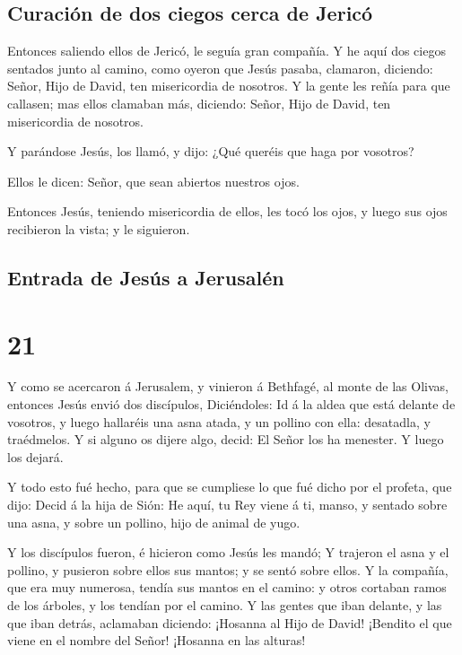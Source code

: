 \hypertarget{curaciuxf3n-de-dos-ciegos-cerca-de-jericuxf3}{%
\subsection{Curación de dos ciegos cerca de
Jericó}\label{curaciuxf3n-de-dos-ciegos-cerca-de-jericuxf3}}

 Entonces saliendo ellos de Jericó, le seguía gran
compañía.  Y he aquí dos ciegos sentados junto al camino,
como oyeron que Jesús pasaba, clamaron, diciendo: Señor, Hijo de David,
ten misericordia de nosotros.  Y la gente les reñía para
que callasen; mas ellos clamaban más, diciendo: Señor, Hijo de David,
ten misericordia de nosotros.

 Y parándose Jesús, los llamó, y dijo: ¿Qué queréis que
haga por vosotros?

 Ellos le dicen: Señor, que sean abiertos nuestros ojos.

 Entonces Jesús, teniendo misericordia de ellos, les tocó
los ojos, y luego sus ojos recibieron la vista; y le siguieron.

\hypertarget{entrada-de-jesuxfas-a-jerusaluxe9n}{%
\subsection{Entrada de Jesús a
Jerusalén}\label{entrada-de-jesuxfas-a-jerusaluxe9n}}

\hypertarget{section-20}{%
\section{21}\label{section-20}}

 Y como se acercaron á Jerusalem, y vinieron á Bethfagé, al
monte de las Olivas, entonces Jesús envió dos discípulos, 
Diciéndoles: Id á la aldea que está delante de vosotros, y luego
hallaréis una asna atada, y un pollino con ella: desatadla, y
traédmelos.  Y si alguno os dijere algo, decid: El Señor los
ha menester. Y luego los dejará.

 Y todo esto fué hecho, para que se cumpliese lo que fué
dicho por el profeta, que dijo:  Decid á la hija de Sión: He
aquí, tu Rey viene á ti, manso, y sentado sobre una asna, y sobre un
pollino, hijo de animal de yugo.

 Y los discípulos fueron, é hicieron como Jesús les mandó;
 Y trajeron el asna y el pollino, y pusieron sobre ellos sus
mantos; y se sentó sobre ellos.  Y la compañía, que era muy
numerosa, tendía sus mantos en el camino: y otros cortaban ramos de los
árboles, y los tendían por el camino.  Y las gentes que iban
delante, y las que iban detrás, aclamaban diciendo: ¡Hosanna al Hijo de
David! ¡Bendito el que viene en el nombre del Señor! ¡Hosanna en las
alturas!

